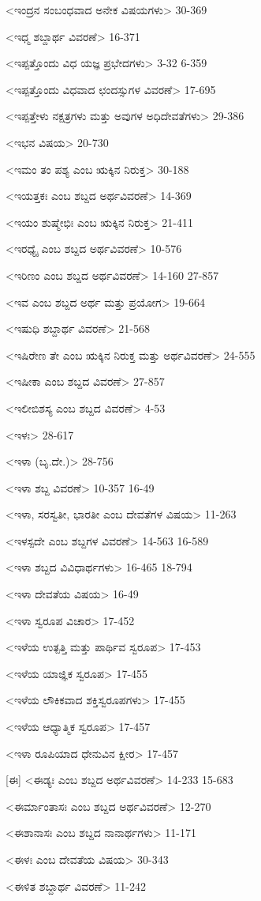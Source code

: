 <ಇಂದ್ರನ ಸಂಬಂಧವಾದ ಅನೇಕ ವಿಷಯಗಳು>
30-369

<ಇಧ್ಮ ಶಬ್ದಾರ್ಥ ವಿವರಣೆ>
16-371

<ಇಪ್ಪತ್ತೊಂದು ವಿಧ ಯಜ್ಞ ಪ್ರಭೇದಗಳು>
3-32
6-359

<ಇಪ್ಪತ್ತೊಂದು ವಿಧವಾದ ಛಂದಸ್ಸುಗಳ ವಿವರಣೆ>
17-695

<ಇಪ್ಪತ್ತೇಳು ನಕ್ಷತ್ರಗಳು ಮತ್ತು ಅವುಗಳ ಅಧಿದೇವತೆಗಳು>
29-386

<ಇಭನ ವಿಷಯ>
20-730

<ಇಮಂ ತಂ ಪಶ್ಯ ಎಂಬ ಋಕ್ಕಿನ ನಿರುಕ್ತ>
30-188


<ಇಯತ್ತಕಃ ಎಂಬ ಶಬ್ದದ ಅರ್ಥವಿವರಣೆ>
14-369

<ಇಯಂ ಶುಷ್ಮೇಭಿಃ ಎಂಬ ಋಕ್ಕಿನ ನಿರುಕ್ತ>
21-411

<ಇರಧ್ಯೈ ಎಂಬ ಶಬ್ದದ ಅರ್ಥವಿವರಣೆ>
10-576

<ಇರಿಣಂ ಎಂಬ ಶಬ್ದದ ಅರ್ಥವಿವರಣೆ>
14-160
27-857

<ಇವ ಎಂಬ ಶಬ್ದದ ಅರ್ಥ ಮತ್ತು ಪ್ರಯೋಗ>
19-664

<ಇಷುಧಿ ಶಬ್ದಾರ್ಥ ವಿವರಣೆ>
21-568

<ಇಷಿರೇಣ ತೇ ಎಂಬ ಋಕ್ಕಿನ ನಿರುಕ್ತ ಮತ್ತು ಅರ್ಥವಿವರಣೆ>
24-555

<ಇಷೀಕಾ ಎಂಬ ಶಬ್ದದ ವಿವರಣೆ>
27-857

<ಇಲೀಬಿಶಸ್ಯ ಎಂಬ ಶಬ್ದದ ವಿವರಣೆ>
4-53

<ಇಳಃ>
28-617

<ಇಳಾ (ಬೃ.ದೇ.)>
28-756

<ಇಳಾ ಶಬ್ದ ವಿವರಣೆ>
10-357
16-49

<ಇಳಾ, ಸರಸ್ವತೀ, ಭಾರತೀ ಎಂಬ ದೇವತೆಗಳ ವಿಷಯ>
11-263

<ಇಳಸ್ಪದೇ ಎಂಬ ಶಬ್ದಗಳ ವಿವರಣೆ>
14-563
16-589

<ಇಳಾ ಶಬ್ದದ ವಿವಿಧಾರ್ಥಗಳು>
16-465
18-794

<ಇಳಾ ದೇವತೆಯ ವಿಷಯ>
16-49

<ಇಳಾ ಸ್ವರೂಪ ವಿಚಾರ>
17-452

<ಇಳೆಯ ಉತ್ಪತ್ತಿ ಮತ್ತು ಪಾರ್ಥಿವ ಸ್ವರೂಪ>
17-453

<ಇಳೆಯ ಯಾಜ್ಞಿಕ ಸ್ವರೂಪ>
17-455

<ಇಳೆಯ ಲೌಕಿಕವಾದ ಶಕ್ತಿಸ್ವರೂಪಗಳು>
17-455

<ಇಳೆಯ ಆಧ್ಯಾತ್ಮಿಕ ಸ್ವರೂಪ>
17-457

<ಇಳಾ ರೂಪಿಯಾದ ಧೇನುವಿನ ಕ್ಷೀರ>
17-457

[ಈ]
<ಈಡ್ಯಃ ಎಂಬ ಶಬ್ದದ ಅರ್ಥವಿವರಣೆ>
14-233
15-683

<ಈರ್ಮಾಂತಾಸಃ ಎಂಬ ಶಬ್ದದ ಅರ್ಥವಿವರಣೆ>
12-270

<ಈಶಾನಾಸಃ ಎಂಬ ಶಬ್ದದ ನಾನಾರ್ಥಗಳು>
11-171

<ಈಳಃ ಎಂಬ ದೇವತೆಯ ವಿಷಯ>
30-343

<ಈಳಿತ ಶಬ್ದಾರ್ಥ ವಿವರಣೆ>
11-242

